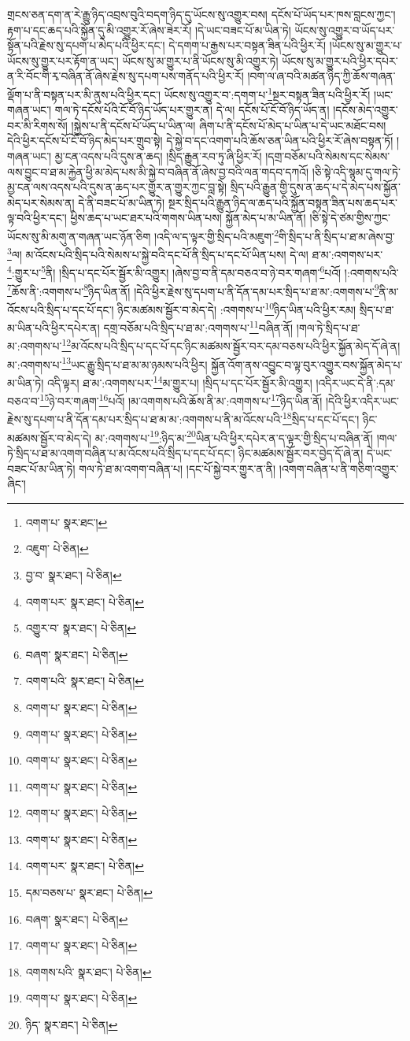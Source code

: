 གྲངས་ཅན་དག་ན་རེ་རྒྱུ་ཉིད་འབྲས་བུའི་བདག་ཉིད་དུ་ཡོངས་སུ་འགྱུར་བས། དངོས་པོ་ཡོད་པར་ཁས་བླངས་ཀྱང་། རྟག་པ་དང་ཆད་པའི་སྐྱོན་དུ་མི་འགྱུར་རོ་ཞེས་ཟེར་རོ། །དེ་ཡང་བཟང་པོ་མ་ཡིན་ཏེ། ཡོངས་སུ་འགྱུར་བ་ཡོད་པར་སྟོན་པའི་རྗེས་སུ་དཔག་པ་མེད་པའི་ཕྱིར་དང་། དེ་དགག་པ་རྒྱས་པར་བསྟན་ཟིན་པའི་ཕྱིར་རོ། །ཡོངས་སུ་མ་གྱུར་པ་ཡོངས་སུ་གྱུར་པར་རྟོག་ན་ཡང་། ཡོངས་སུ་མ་གྱུར་པ་ནི་ཡོངས་སུ་མི་འགྱུར་ཏེ། ཡོངས་སུ་མ་གྱུར་པའི་ཕྱིར་དཔེར་ན་རི་བོང་གི་རྭ་བཞིན་ནོ་ཞེས་རྗེས་སུ་དཔག་པས་གནོད་པའི་ཕྱིར་རོ། །བག་ལ་ཞ་བའི་མཚན་ཉིད་ཀྱི་ཆོས་གཞན་ལྡོག་པ་ནི་བསྟན་པར་མི་ནུས་པའི་ཕྱིར་དང་། ཡོངས་སུ་འགྱུར་བ་:དགག་པ་\footnote{འགག་པ་  སྣར་ཐང་། }སྔར་བསྟན་ཟིན་པའི་ཕྱིར་རོ། །ཡང་གཞན་ཡང་། གལ་ཏེ་དངོས་པོའི་ངོ་བོ་ཉིད་ཡོད་པར་གྱུར་ན། དེ་ལ། དངོས་པོ་ངོ་བོ་ཉིད་ཡོད་ན། །དངོས་མེད་འགྱུར་བར་མི་རིགས་སོ། །སྐྱེས་པ་ནི་དངོས་པོ་ཡོད་པ་ཡིན་ལ། ཞིག་པ་ནི་དངོས་པོ་མེད་པ་ཡིན་པ་དེ་ཡང་མཐོང་བས། དེའི་ཕྱིར་དངོས་པོ་ངོ་བོ་ཉིད་མེད་པར་གྲུབ་སྟེ། དེ་སྐྱེ་བ་དང་འགག་པའི་ཆོས་ཅན་ཡིན་པའི་ཕྱིར་རོ་ཞེས་བསྟན་ཏོ། །གཞན་ཡང་། མྱ་ངན་འདས་པའི་དུས་ན་ཆད། །སྲིད་རྒྱུན་རབ་ཏུ་ཞི་ཕྱིར་རོ། །དགྲ་བཅོམ་པའི་སེམས་དང་སེམས་ལས་བྱུང་བ་ཐ་མ་རྐྱེན་ཕྱི་མ་མེད་པས་མི་སྐྱེ་བ་བཞིན་ནོ་ཞེས་བྱ་བའི་ལན་གདབ་དཀའོ། །ཅི་སྟེ་འདི་སྙམ་དུ་གལ་ཏེ་མྱ་ངན་ལས་འདས་པའི་དུས་ན་ཆད་པར་གྱུར་ན་གྱུར་ཀྱང་བླ་སྟེ། སྲིད་པའི་རྒྱུན་གྱི་དུས་ན་ཆད་པ་དེ་མེད་པས་སྐྱོན་མེད་པར་སེམས་ན། དེ་ནི་བཟང་པོ་མ་ཡིན་ཏེ། སྔར་སྲིད་པའི་རྒྱུན་ཉིད་ལ་ཆད་པའི་སྐྱོན་བསྟན་ཟིན་པས་ཆད་པར་ལྟ་བའི་ཕྱིར་དང་། ཕྱིས་ཆད་པ་ཡང་ཐར་པའི་གགས་ཡིན་པས། སྐྱོན་མེད་པ་མ་ཡིན་ནོ། །ཅི་སྟེ་དེ་ཙམ་གྱིས་ཀྱང་ཡོངས་སུ་མི་མགུ་ན་གཞན་ཡང་ཉོན་ཅིག །འདི་ལ་ད་ལྟར་གྱི་སྲིད་པའི་མཇུག་\footnote{འཇུག་  པེ་ཅིན། }གི་སྲིད་པ་ནི་སྲིད་པ་ཐ་མ་ཞེས་བྱ་\footnote{བྱ་བ་  སྣར་ཐང་།  པེ་ཅིན། }ལ། མ་འོངས་པའི་སྲིད་པའི་སེམས་པ་སྐྱེ་བའི་དང་པོ་ནི་སྲིད་པ་དང་པོ་ཡིན་པས། དེ་ལ། ཐ་མ་:འགགས་པར་\footnote{འགག་པར་  སྣར་ཐང་།  པེ་ཅིན། }:གྱུར་པ་\footnote{འགྱུར་བ་  སྣར་ཐང་།  པེ་ཅིན། }ནི། །སྲིད་པ་དང་པོར་སྦྱོར་མི་འགྱུར། །ཞེས་བྱ་བ་ནི་དམ་བཅའ་བ་ཉེ་བར་གཞག་\footnote{བཞག་  སྣར་ཐང་།  པེ་ཅིན། }པའོ། །:འགགས་པའི་\footnote{འགག་པའི་  སྣར་ཐང་།  པེ་ཅིན། }ཆོས་ནི་:འགགས་པ་\footnote{འགག་པ་  སྣར་ཐང་།  པེ་ཅིན། }ཉིད་ཡིན་ནོ། །དེའི་ཕྱིར་རྗེས་སུ་དཔག་པ་ནི་དོན་དམ་པར་སྲིད་པ་ཐ་མ་:འགགས་པ་\footnote{འགག་པ་  སྣར་ཐང་།  པེ་ཅིན། }ནི་མ་འོངས་པའི་སྲིད་པ་དང་པོ་དང་། ཉིང་མཚམས་སྦྱོར་བ་མེད་དེ། :འགགས་པ་\footnote{འགག་པ་  སྣར་ཐང་།  པེ་ཅིན། }ཉིད་ཡིན་པའི་ཕྱིར་རམ། སྲིད་པ་ཐ་མ་ཡིན་པའི་ཕྱིར་དཔེར་ན། དགྲ་བཅོམ་པའི་སྲིད་པ་ཐ་མ་:འགགས་པ་\footnote{འགག་པ་  སྣར་ཐང་།  པེ་ཅིན། }བཞིན་ནོ། །གལ་ཏེ་སྲིད་པ་ཐ་མ་:འགགས་པ་\footnote{འགག་པ་  སྣར་ཐང་།  པེ་ཅིན། }མ་འོངས་པའི་སྲིད་པ་དང་པོ་དང་ཉིང་མཚམས་སྦྱོར་བར་དམ་བཅས་པའི་ཕྱིར་སྐྱོན་མེད་དོ་ཞེ་ན། མ་:འགགས་པ་\footnote{འགག་པ་  སྣར་ཐང་།  པེ་ཅིན། }ཡང་རྒྱུ་སྲིད་པ་ཐ་མ་མ་ཉམས་པའི་ཕྱིར། སྐྱོན་འོག་ནས་འབྱུང་བ་ལྟ་བུར་འགྱུར་བས་སྐྱོན་མེད་པ་མ་ཡིན་ཏེ། འདི་ལྟར། ཐ་མ་:འགགས་པར་\footnote{འགག་པར་  སྣར་ཐང་།  པེ་ཅིན། }མ་གྱུར་པ། །སྲིད་པ་དང་པོར་སྦྱོར་མི་འགྱུར། །འདིར་ཡང་དེ་ནི་:དམ་བཅའ་བ་\footnote{དམ་བཅས་པ་  སྣར་ཐང་།  པེ་ཅིན། }ཉེ་བར་གཞག་\footnote{བཞག་  སྣར་ཐང་།  པེ་ཅིན། }པའོ། །མ་འགགས་པའི་ཆོས་ནི་མ་:འགགས་པ་\footnote{འགག་པ་  སྣར་ཐང་།  པེ་ཅིན། }ཉིད་ཡིན་ནོ། །དེའི་ཕྱིར་འདིར་ཡང་རྗེས་སུ་དཔག་པ་ནི་དོན་དམ་པར་སྲིད་པ་ཐ་མ་མ་:འགགས་པ་ནི་མ་འོངས་པའི་\footnote{འགགས་པའི་  སྣར་ཐང་།  པེ་ཅིན། }སྲིད་པ་དང་པོ་དང་། ཉིང་མཚམས་སྦྱོར་བ་མེད་དེ། མ་:འགགས་པ་\footnote{འགག་པ་  སྣར་ཐང་།  པེ་ཅིན། }:ཉིད་མ་\footnote{ཉིད་  སྣར་ཐང་།  པེ་ཅིན། }ཡིན་པའི་ཕྱིར་དཔེར་ན་ད་ལྟར་གྱི་སྲིད་པ་བཞིན་ནོ། །གལ་ཏེ་སྲིད་པ་ཐ་མ་འགག་བཞིན་པ་མ་འོངས་པའི་སྲིད་པ་དང་པོ་དང་། ཉིང་མཚམས་སྦྱོར་བར་བྱེད་དོ་ཞེ་ན། དེ་ཡང་བཟང་པོ་མ་ཡིན་ཏེ། གལ་ཏེ་ཐ་མ་འགག་བཞིན་པ། །དང་པོ་སྐྱེ་བར་གྱུར་ན་ནི། །འགག་བཞིན་པ་ནི་གཅིག་འགྱུར་ཞིང་། 